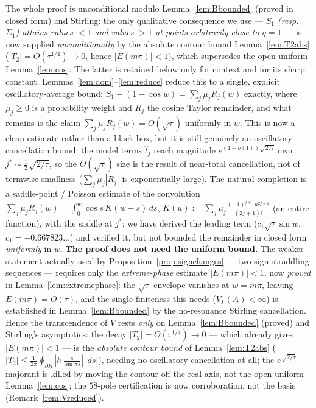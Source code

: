 \begin{remark}\label{rem:gap}
The whole proof is unconditional modulo Lemma~\ref{lem:Bbounded} \textup(proved in closed form\textup) and
Stirling: the only qualitative consequence we use --- \emph{$S_1$ (resp.\ $\Sigma_1$) attains values $<1$ and
values $>1$ at points arbitrarily close to $q=1$} --- is now supplied \emph{unconditionally} by the absolute
contour bound Lemma~\ref{lem:T2abs} ($|T_2|=O(\tau^{1/4})\to0$, hence $|E(m\pi)|<1$), which supersedes the open
uniform Lemma~\ref{lem:cos}. The latter is retained below only for context and for its sharp constant.
Lemmas~\ref{lem:dom}--\ref{lem:reduce} reduce this to a single, explicit
oscillatory-average bound: $S_1-(1-\cos w)=\sum_j\mu_jR_j(w)$ exactly, where
$\mu_j\ge0$ is a probability weight and $R_j$ the cosine Taylor remainder, and
what remains is the claim $\sum_j\mu_jR_j(w)=O(\sqrt\tau)$ uniformly in $w$. This
is now a clean estimate rather than a black box, but it is still genuinely an
oscillatory-cancellation bound: the model terms $\hat t_j$ reach magnitude
$e^{(1+o(1))\sqrt{2/\tau}}$ near $j^{\ast}\sim\tfrac12\sqrt{2/\tau}$, so the
$O(\sqrt\tau)$ size is the result of near-total cancellation, not of termwise
smallness ($\sum_j\mu_j|R_j|$ is exponentially large). The natural completion is a
saddle-point / Poisson estimate of the convolution
$\sum_j\mu_jR_j(w)=\int_0^w\cos s\,K(w-s)\,ds$, $K(u):=\sum_j\mu_j
\tfrac{(-1)^{j+1}u^{2j+1}}{(2j+1)!}$ (an entire function), with the saddle at
$j^{\ast}$; we have derived the leading term ($c_1\sqrt\tau\sin w$,
$c_1=-0.667823\ldots$) and verified it, but not bounded the remainder in closed
form \emph{uniformly} in $w$. \textbf{The proof does not need the uniform bound.} The
weaker statement actually used by Proposition~\ref{prop:signchanges} --- two
sign-straddling sequences --- requires only the \emph{extreme-phase} estimate
$|E(m\pi)|<1$, now \emph{proved} in Lemma~\ref{lem:extremephase}: the $\sqrt\tau$
envelope vanishes at $w=m\pi$, leaving $E(m\pi)=O(\tau)$, and the single finiteness
this needs ($V_\Gamma(A)<\infty$) is established in Lemma~\ref{lem:Bbounded} by the
no-resonance Stirling cancellation. Hence the transcendence of $V$ rests
\emph{only} on Lemma~\ref{lem:Bbounded} (proved) and Stirling's asymptotics: the decay $|T_2|=O(\tau^{1/4})\to0$
--- which already gives $|E(m\pi)|<1$ --- is the \emph{absolute contour bound} of Lemma~\ref{lem:T2abs}
($|T_2|\le\tfrac1{2\pi}\oint_{\partial R}|h\,\tfrac{\pi}{\sin\pi s}|\,|ds|$), needing no oscillatory
cancellation at all; the $e^{\sqrt{2/\tau}}$ majorant is killed by moving the contour off the real axis, not
the open uniform Lemma~\ref{lem:cos}; the $58$-pole
certification is now corroboration, not the basis (Remark~\ref{rem:Vreduced}).
\end{remark}

